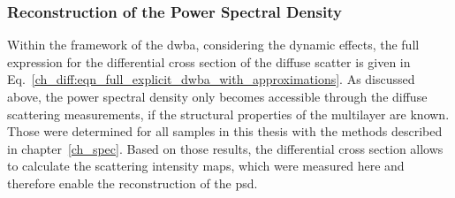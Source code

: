 \subsubsection{Reconstruction of the Power Spectral Density}
Within the framework of the \gls{dwba}, considering the dynamic effects, the full expression for the differential cross section of the diffuse scatter is given in Eq.~\eqref{ch_diff:eqn_full_explicit_dwba_with_approximations}. As discussed above, the power spectral density only becomes accessible through the diffuse scattering measurements, if the structural properties of the multilayer are known. Those were determined for all samples in this thesis with the methods described in chapter~\ref{ch_spec}. Based on those results, the differential cross section allows to calculate the scattering intensity maps, which were measured here and therefore enable the reconstruction of the \gls{psd}.

